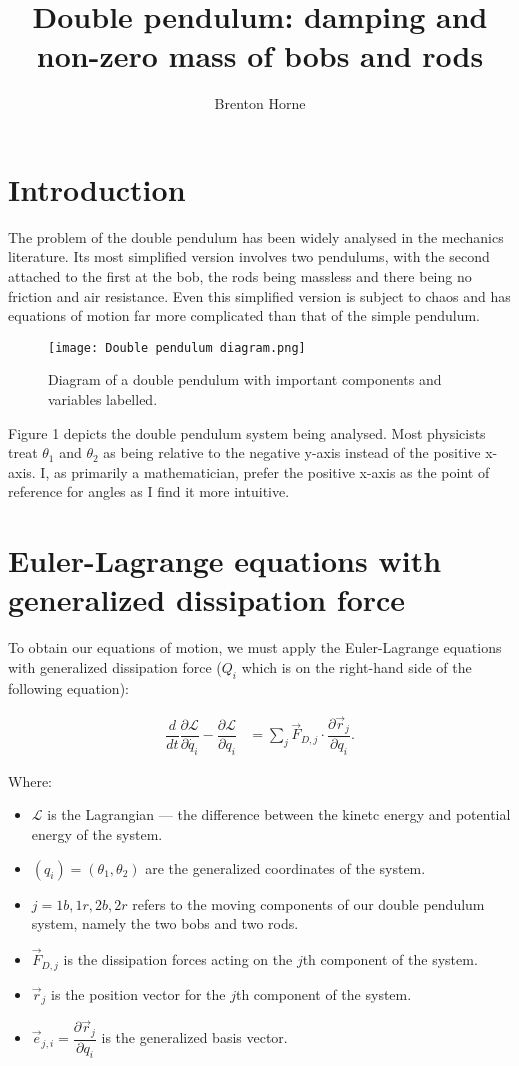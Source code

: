 \documentclass[12pt,a4paper,portrait]{article}
\date{}
\title{Double pendulum: damping and non-zero mass of bobs and rods}
\author{Brenton Horne}
\begin{document}
	\maketitle
	\tableofcontents
	
	\section{Introduction}
	The problem of the double pendulum has been widely analysed in the mechanics literature. Its most simplified version involves two pendulums, with the second attached to the first at the bob, the rods being massless and there being no friction and air resistance. Even this simplified version is subject to chaos and has equations of motion far more complicated than that of the simple pendulum.  
	\begin{figure}[H]
		\centering
		\texttt{[image: Double pendulum diagram.png]}
		\caption{Diagram of a double pendulum with important components and variables labelled.}
	\end{figure}
	Figure 1 depicts the double pendulum system being analysed. Most physicists treat $\theta_1$ and $\theta_2$ as being relative to the negative y-axis instead of the positive x-axis. I, as primarily a mathematician, prefer the positive x-axis as the point of reference for angles as I find it more intuitive. 
	
	\section{Euler-Lagrange equations with generalized dissipation force}
	To obtain our equations of motion, we must apply the Euler-Lagrange equations with generalized dissipation force ($Q_i$ which is on the right-hand side of the following equation):
	
	\begin{align}
		\dfrac{d}{dt}\dfrac{\partial \mathcal{L}}{\partial \dot{q_i}} - \dfrac{\partial \mathcal{L}}{\partial q_i} &=  \sum_j \vec{F}_{D,j} \cdot \dfrac{\partial \vec{r}_j}{\partial q_i}. \label{ELD}
	\end{align}
	
	Where:
	\begin{itemize}
		\item $\mathcal{L}$ is the Lagrangian --- the difference between the kinetc energy and potential energy of the system. 
		\item $(q_i)=(\theta_1,\theta_2)$ are the generalized coordinates of the system.
		\item $j=1b,1r,2b,2r$ refers to the moving components of our double pendulum system, namely the two bobs and two rods.
		\item $\vec{F}_{D,j}$ is the dissipation forces acting on the $j$th component of the system.
		\item $\vec{r}_j$ is the position vector for the $j$th component of the system.
		\item $\vec{e}_{j,i}=\dfrac{\partial \vec{r}_j}{\partial q_i}$ is the generalized basis vector.
	\end{itemize}
	
\end{document}

